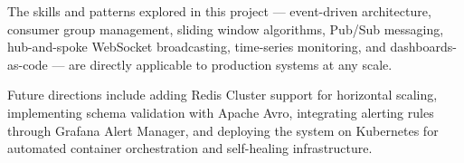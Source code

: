 \documentclass[12pt,a4paper]{article}
\begin{document}
The skills and patterns explored in this project --- event-driven architecture, consumer group management, sliding window algorithms, Pub/Sub messaging, hub-and-spoke WebSocket broadcasting, time-series monitoring, and dashboards-as-code --- are directly applicable to production systems at any scale.

Future directions include adding Redis Cluster support for horizontal scaling, implementing schema validation with Apache Avro, integrating alerting rules through Grafana Alert Manager, and deploying the system on Kubernetes for automated container orchestration and self-healing infrastructure.
\end{document}
